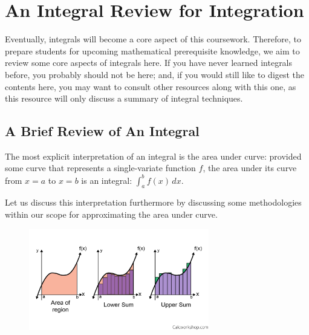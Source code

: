 \chapter{An Integral Review for Integration}
Eventually, integrals will become a core aspect of this coursework.
Therefore, to prepare students for upcoming mathematical prerequisite knowledge, we aim to review some core aspects of integrals here.
If you have never learned integrals before, you probably should not be here; and, if you would still like to digest the contents here, you may want to consult other resources along with this one, as this resource will only discuss a summary of integral techniques.

\section{A Brief Review of An Integral}
The most explicit interpretation of an integral is the area under curve: provided some curve that represents a single-variate function $f$, the area under its curve from $x = a$ to $x = b$ is an integral: $\int_a^b f(x) \,dx$.

Let us discuss this interpretation furthermore by discussing some methodologies within our scope for approximating the area under curve.
\begin{center}
    \begin{figure}
        \centering
        \includegraphics[width=0.7\textwidth]{figs/ln10/riemann-sums-area-distances.png}
    \end{figure}
\end{center}

